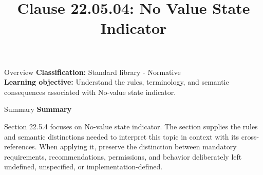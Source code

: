 \documentclass[10pt,letterpaper]{article}
\title{Clause 22.05.04: No Value State Indicator}
\author{}
\date{}
\begin{document}
\maketitle
\begin{CornellOverviewBox}{Overview}
\textbf{Classification:} Standard library - Normative\\[2pt]
\textbf{Learning objective:} Understand the rules, terminology, and semantic consequences associated with No-value state indicator.
\end{CornellOverviewBox}\begin{CornellSummaryBox}{Summary}
{\sffamily\bfseries\color{Accent} Summary}\par\vspace{3pt}Section 22.5.4 focuses on No-value state indicator. The section supplies the rules and semantic distinctions needed to interpret this topic in context with its cross-references. When applying it, preserve the distinction between mandatory requirements, recommendations, permissions, and behavior deliberately left undefined, unspecified, or implementation-defined.
\end{CornellSummaryBox}
\end{document}
